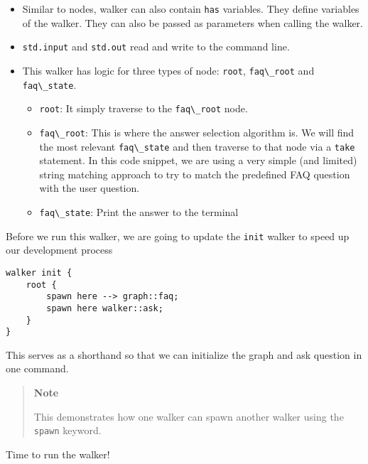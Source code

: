 \begin{itemize}
\tightlist
\item
  Similar to nodes, walker can also contain
  \passthrough{\lstinline!has!} variables. They define variables of the
  walker. They can also be passed as parameters when calling the walker.
\item
  \passthrough{\lstinline!std.input!} and
  \passthrough{\lstinline!std.out!} read and write to the command line.
\item
  This walker has logic for three types of node:
  \passthrough{\lstinline!root!}, \passthrough{\lstinline!faq\_root!}
  and \passthrough{\lstinline!faq\_state!}.

  \begin{itemize}
  \tightlist
  \item
    \passthrough{\lstinline!root!}: It simply traverse to the
    \passthrough{\lstinline!faq\_root!} node.
  \item
    \passthrough{\lstinline!faq\_root!}: This is where the answer
    selection algorithm is. We will find the most relevant
    \passthrough{\lstinline!faq\_state!} and then traverse to that node
    via a \passthrough{\lstinline!take!} statement. In this code
    snippet, we are using a very simple (and limited) string matching
    approach to try to match the predefined FAQ question with the user
    question.
  \item
    \passthrough{\lstinline!faq\_state!}: Print the answer to the
    terminal
  \end{itemize}
\end{itemize}

Before we run this walker, we are going to update the
\passthrough{\lstinline!init!} walker to speed up our development
process

\begin{lstlisting}
walker init {
    root {
        spawn here --> graph::faq;
        spawn here walker::ask;
    }
}
\end{lstlisting}

This serves as a shorthand so that we can initialize the graph and ask
question in one command.

\begin{quote}
\textbf{Note}

This demonstrates how one walker can spawn another walker using the
\passthrough{\lstinline!spawn!} keyword.
\end{quote}

Time to run the walker!

